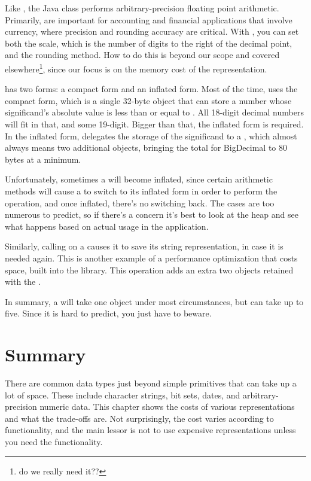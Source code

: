Like , the Java class  performs
arbitrary-precision floating point arithmetic. Primarily,
 are important for accounting and financial applications that
involve currency, where precision and rounding accuracy are critical. With ,
you can set both the scale, which is the number of digits to the right of the
decimal point, and the rounding method. How to do this is beyond our scope and
covered elsewhere\footnote{do we really need it??}, since our focus is on the
memory cost of the representation.

 has two forms: a compact form and an
inflated form. Most of the time,  uses the compact form,
which is a single 32-byte object that can store a number whose significand's
absolute value is less than or equal to .
All 18-digit decimal numbers will fit in that, and some 19-digit.  Bigger than
that, the inflated form is required. In the inflated form, 
delegates the storage of the significand to a , which almost always means two additional
objects, bringing the total for BigDecimal to 80 bytes at a
minimum.  

Unfortunately, sometimes a  will become inflated,
since certain arithmetic methods will cause a  to switch to its inflated form in order to perform the operation, and once inflated,
there's no switching back.  The cases are too numerous to predict, so if there's
a concern it's best to look at the heap and see what happens based on actual usage in the 
application.

Similarly, calling  on a  causes it to
save its string representation, in case it is needed again.
This is another example of a performance optimization that 
costs space, built into the library.  This operation adds an extra two objects
retained with the . 

In summary, a  will take one
object under most circumstances, but can take up to five. Since it is hard to
predict, you just have to beware.

\section{Summary} 

There are common data types just beyond simple primitives that can
take up a lot of space.  These include character strings, bit sets, dates, and
arbitrary-precision numeric data. This chapter shows the costs of various
representations and what the trade-offs are. Not surprisingly, the cost varies
according to functionality, and the main lessor is not to use expensive
representations unless you need the functionality.

